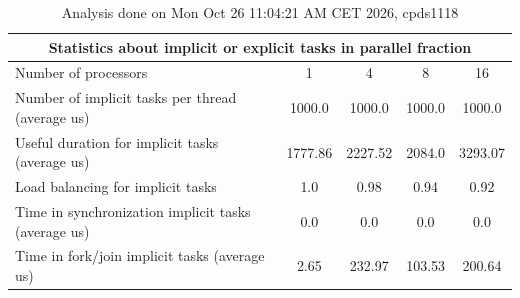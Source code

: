 \begin{table}[h]
\begin{center}
\begin{tabular}{|l|c|c|c|c|}
\hline
\multicolumn{5}{|c|}{Statistics about implicit or explicit tasks in parallel fraction} \\
\hline
\hline
Number of processors & 1 & 4 & 8 & 16 \\
\hline
\hline
Number of implicit tasks per thread (average us)    &          1000.0 &          1000.0 &          1000.0 &          1000.0 \\
\hline
Useful duration for implicit tasks (average us)     &         1777.86 &         2227.52 &          2084.0 &         3293.07 \\
\hline
Load balancing for implicit tasks                &             1.0 &            0.98 &            0.94 &            0.92 \\
\hline
Time in synchronization implicit tasks (average us) &             0.0 &             0.0 &             0.0 &             0.0 \\
\hline
Time in fork/join implicit tasks (average us)       &            2.65 &          232.97 &          103.53 &          200.64 \\
\hline
\end{tabular}
\end{center}
\caption{ Analysis done on Mon Oct 26 11:04:21 AM CET 2026, cpds1118}
\end{table}
